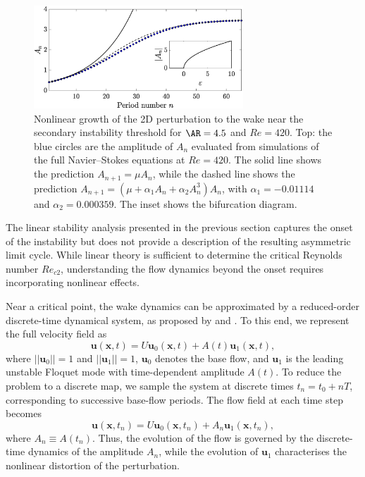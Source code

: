 \begin{figure}
  \centering
  \includegraphics[width=0.7\textwidth]{./fig/AR4p5/Nlgrowth_Re420.eps}
  \caption{Nonlinear growth of the 2D perturbation to the wake near the secondary instability threshold for $\AR=4.5$ and $Re=420$. Top: the blue circles are the amplitude of $A_n$ evaluated from simulations of the full Navier--Stokes equations at $Re=420$. The solid line shows the prediction $A_{n+1} = \mu A_n$, while the dashed line shows the prediction $A_{n+1} = ( \mu + \alpha_1 A_n + \alpha_2 A_n^3 ) A_n$, with $\alpha_1 = -0.01114$ and $\alpha_2 = 0.000359$. The inset shows the bifurcation diagram.}
  \label{fig:ar4p5_nnl}
\end{figure}

The linear stability analysis presented in the previous section captures the onset of the instability but does not provide a description of the resulting asymmetric limit cycle. While linear theory is sufficient to determine the critical Reynolds number $Re_{c2}$, understanding the flow dynamics beyond the onset requires incorporating nonlinear effects.

Near a critical point, the wake dynamics can be approximated by a reduced-order discrete-time dynamical system, as proposed by \cite{henderson-barkley-1996} and \cite{henderson-1997}. To this end, we represent the full velocity field as
%
\begin{equation}
\bm{u}(\bm{x}, t) = U \bm{u}_0(\bm{x}, t) + A(t) \bm{u}_1(\bm{x}, t),
\end{equation}
%
where $||\bm{u}_0||=1$ and $||\bm{u}_1||=1$, $\bm{u}_0$ denotes the base flow, and $\bm{u}_1$ is the leading unstable Floquet mode with time-dependent amplitude $A(t)$. To reduce the problem to a discrete map, we sample the system at discrete times $t_n = t_0 + nT$, corresponding to successive base-flow periods. The flow field at each time step becomes
%
\begin{equation}
\bm{u}(\bm{x}, t_n) = U \bm{u}_0(\bm{x}, t_n) + A_n \bm{u}_1(\bm{x}, t_n),
\end{equation}
%
where $A_n \equiv A(t_n)$. Thus, the evolution of the flow is governed by the discrete-time dynamics of the amplitude $A_n$, while the evolution of $\bm{u}_1$ characterises the nonlinear distortion of the perturbation.

